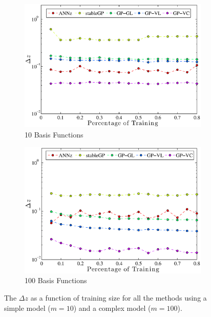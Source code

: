 \documentclass[useAMS,usenatbib,fleqn]{mn2e}
\begin{document}
\begin{figure}
        \centering
        \begin{subfigure}[b]{\columnwidth}
                \includegraphics[width=\textwidth]{figures/percentage10.eps}
                \caption{10 Basis Functions}
                \label{fig-training-percentage-10}
        \end{subfigure}	
        \begin{subfigure}[b]{\columnwidth}
                \includegraphics[width=\textwidth]{figures/percentage100.eps}
                \caption{100 Basis Functions}
                \label{ffig-training-percentage-100}
        \end{subfigure}
       \caption{The $\Delta z$ as a function of training size for all the methods using a simple model ($m=10$) and a complex model ($m=100$).}
	\label{fig-normal-balanced}
\end{figure}
\end{document}
